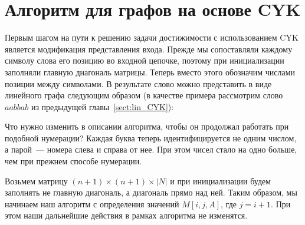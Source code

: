 \section{Алгоритм для графов на основе CYK}
\label{graph:CYK}

Первым шагом на пути к решению задачи достижимости с использованием CYK является модификация представления входа.
Прежде мы сопоставляли каждому символу слова его позицию во входной цепочке, поэтому при инициализации заполняли главную диагональ матрицы.
Теперь вместо этого обозначим числами позиции между символами.
В результате слово можно представить в виде линейного графа следующим образом (в качестве примера рассмотрим слово $a a b b a b$ из предыдущей главы~\ref{sect:lin_CYK}):
\begin{center}
\end{center}

Что нужно изменить в описании алгоритма, чтобы он продолжал работать при подобной нумерации?
Каждая буква теперь идентифицируется не одним числом, а парой~--- номера слева и справа от нее.
При этом чисел стало на одно больше, чем при прежнем способе нумерации.

Возьмем матрицу $(n + 1) \times (n + 1) \times  |N|$ и при инициализации будем заполнять не главную диагональ, а диагональ прямо над ней.
Таким образом, мы начинаем наш алгоритм с определения значений $M[i, j, A]$, где  $j = i + 1$.
При этом наши дальнейшие действия в рамках алгоритма не изменятся.

